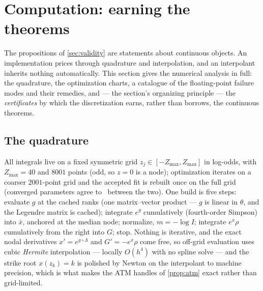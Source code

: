 \section{Computation: earning the theorems}
\label{sec:computation}

The propositions of \cref{sec:validity} are statements about continuous
objects.  An implementation prices through quadrature and interpolation,
and an interpolant inherits nothing automatically.  This section gives
the numerical analysis in full: the quadrature, the optimization charts,
a catalogue of the floating-point failure modes and their remedies, and
--- the section's organizing principle --- the \emph{certificates} by
which the discretization earns, rather than borrows, the continuous
theorems.

\subsection{The quadrature}

All integrals live on a fixed symmetric grid $z_j\in[-Z_{\max},Z_{\max}]$
in log-odds, with $Z_{\max}=40$ and $8001$ points (odd, so $z=0$ is a
node); optimization
iterates on a coarser $2001$-point grid and the accepted fit is rebuilt
once on the full grid (converged parameters agree to \MacTwoGridParamAgree\
between the two).  One build is five steps: evaluate $g$ at the cached
ranks (one matrix--vector product --- $g$ is linear in $\theta$, and the
Legendre matrix is cached); integrate $e^{g}$ cumulatively
(fourth-order Simpson) into $\bar{x}$, anchored at the median node;
normalize, $m=-\log I$; integrate $e^{x}\rho$ cumulatively from the
right into $G$; stop.  Nothing is iterative, and the exact nodal
derivatives $x'=e^{g\circ\Lambda}$ and $G'=-e^{x}\rho$ come free, so
off-grid evaluation uses cubic \emph{Hermite} interpolation --- locally
$O(h^{4})$ with no spline solve --- and the strike root $x(z_k)=k$ is
polished by Newton on the interpolant to machine precision, which is
what makes the ATM handles of \cref{prop:atm} exact rather than
grid-limited.

